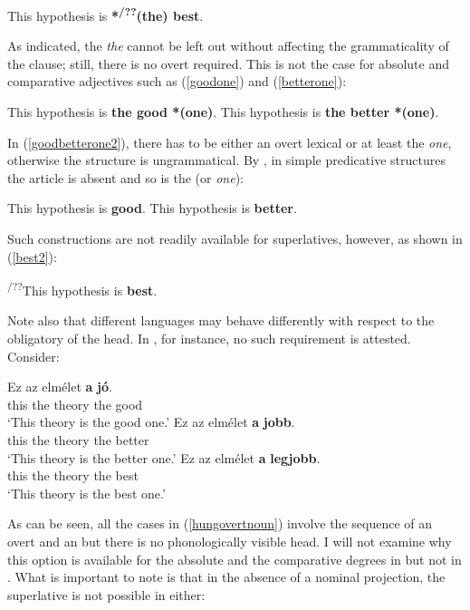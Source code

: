 \ea This hypothesis is \textbf{*\textsuperscript{/??}(the) best}. \label{thebest2}
\z

As indicated, the  \textit{the} cannot be left out without affecting the grammaticality of the clause; still, there is no overt  required. This is not the case for absolute and comparative adjectives such as (\ref{goodone}) and (\ref{betterone}):

\ea \label{goodbetterone2}
\ea This hypothesis is \textbf{the good *(one)}. \label{goodone}
\ex This hypothesis is \textbf{the better *(one)}. \label{betterone}
\z
\z

In (\ref{goodbetterone2}), there has to be either an overt lexical  or at least the  \textit{one}, otherwise the structure is ungrammatical. By , in simple predicative structures the article is absent and so is the  (or \textit{one}):

\ea
\ea	This hypothesis is \textbf{good}.
\ex	This hypothesis is \textbf{better}.
\z
\z

Such constructions are not readily available for superlatives, however, as shown in (\ref{best2}):

\ea	*\textsuperscript{/??}This hypothesis is \textbf{best}. \label{best2}
\z

Note also that different languages may behave differently with respect to the obligatory  of the  head. In , for instance, no such requirement is attested. Consider:

\ea \label{hungovertnoun}
\ea \gll Ez	az	elmélet	\textbf{a}	\textbf{jó}.\\
this the	theory the	good\\
\glt `This theory is the good one.'
\ex	\gll Ez	az	elmélet	\textbf{a}	\textbf{jobb}.\\
this the theory	the	better\\
\glt `This theory is the better one.'
\ex	\gll Ez az	elmélet	\textbf{a}	\textbf{legjobb}.\\
this the theory	the	best\\
\glt `This theory is the best one.'
\z
\z

As can be seen, all the cases in (\ref{hungovertnoun}) involve the sequence of an overt  and an  but there is no phonologically visible  head. I will not examine why this option is available for the absolute and the comparative degrees in  but not in . What is important to note is that in the absence of a nominal projection, the superlative is not possible in  either:

